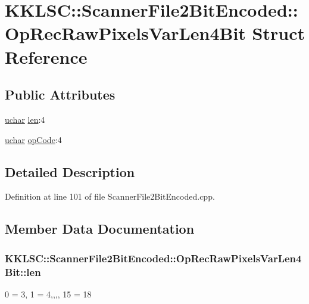 \hypertarget{struct_scanner_file2_bit_encoded_1_1_op_rec_raw_pixels_var_len4_bit}{}\section{K\+K\+L\+SC\+:\+:Scanner\+File2\+Bit\+Encoded\+:\+:Op\+Rec\+Raw\+Pixels\+Var\+Len4\+Bit Struct Reference}
\label{struct_scanner_file2_bit_encoded_1_1_op_rec_raw_pixels_var_len4_bit}
\subsection*{Public Attributes}
\begin{DoxyCompactItemize}
\item 
\hyperlink{namespace_k_k_b_ace9969169bf514f9ee6185186949cdf7}{uchar} \hyperlink{struct_scanner_file2_bit_encoded_1_1_op_rec_raw_pixels_var_len4_bit_a44193c28bee1c64679c51935e58eeb6f}{len}\+:4
\item 
\hyperlink{namespace_k_k_b_ace9969169bf514f9ee6185186949cdf7}{uchar} \hyperlink{struct_scanner_file2_bit_encoded_1_1_op_rec_raw_pixels_var_len4_bit_a23708979dbdba31a21c5312f39614653}{op\+Code}\+:4
\end{DoxyCompactItemize}


\subsection{Detailed Description}


Definition at line 101 of file Scanner\+File2\+Bit\+Encoded.\+cpp.



\subsection{Member Data Documentation}
\subsubsection[{\texorpdfstring{len}{len}}]{ K\+K\+L\+S\+C\+::\+Scanner\+File2\+Bit\+Encoded\+::\+Op\+Rec\+Raw\+Pixels\+Var\+Len4\+Bit\+::len}\hypertarget{struct_scanner_file2_bit_encoded_1_1_op_rec_raw_pixels_var_len4_bit_a44193c28bee1c64679c51935e58eeb6f}{}\label{struct_scanner_file2_bit_encoded_1_1_op_rec_raw_pixels_var_len4_bit_a44193c28bee1c64679c51935e58eeb6f}
0 = 3, 1 = 4,,,, 15 = 18 

